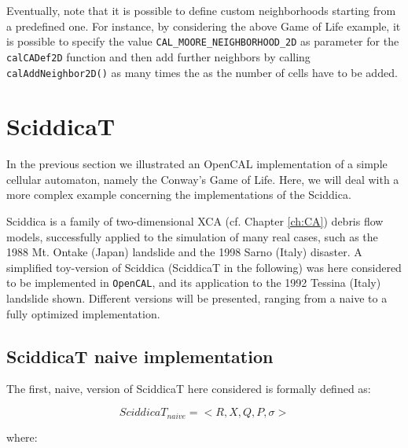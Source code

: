Eventually, note that it is possible to define custom neighborhoods
starting from a predefined one. For instance, by considering the above
Game of Life example, it is possible to specify the value
\verb'CAL_MOORE_NEIGHBORHOOD_2D' as parameter for the
\verb'calCADef2D' function and then add further neighbors by calling
\verb'calAddNeighbor2D()' as many times the as the number of cells
have to be added.

\section{SciddicaT}\label{sec:sciddicaT}
In the previous section we illustrated an OpenCAL implementation of a
simple cellular automaton, namely the Conway’s Game of Life. Here, we
will deal with a more complex example concerning the implementations
of the Sciddica.

Sciddica is a family of two-dimensional XCA (cf. Chapter \ref{ch:CA})
debris flow models, successfully applied to the simulation of many
real cases, such as the 1988 Mt. Ontake (Japan) landslide and the 1998
Sarno (Italy) disaster. A simplified toy-version of Sciddica
(SciddicaT in the following) was here considered to be implemented in
\verb"OpenCAL", and its application to the 1992 Tessina (Italy)
landslide shown. Different versions will be presented, ranging from a
naive to a fully optimized implementation.

\subsection{SciddicaT naive implementation}

The first, naive, version of SciddicaT here considered is formally
defined as:

$$SciddicaT_{naive} = < R, X, Q , P, \sigma  >$$

where:

